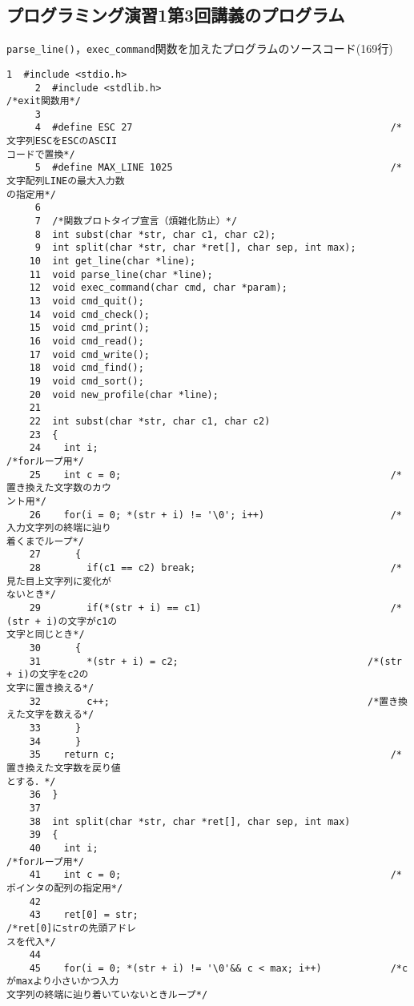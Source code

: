 \subsection{プログラミング演習1第3回講義のプログラム}\label{func3}
\verb|parse_line()|，\verb|exec_command|関数を加えたプログラムのソースコード(169行)
\begin{Verbatim}[fontsize=\small, baselinestretch=0.8]
     1	#include <stdio.h>
     2	#include <stdlib.h>                                        /*exit関数用*/
     3	
     4	#define ESC 27                                             /*文字列ESCをESCのASCII
コードで置換*/
     5	#define MAX_LINE 1025                                      /*文字配列LINEの最大入力数
の指定用*/
     6	
     7	/*関数プロトタイプ宣言（煩雑化防止）*/
     8	int subst(char *str, char c1, char c2);
     9	int split(char *str, char *ret[], char sep, int max);
    10	int get_line(char *line);
    11	void parse_line(char *line);
    12	void exec_command(char cmd, char *param);
    13	void cmd_quit();
    14	void cmd_check();
    15	void cmd_print();
    16	void cmd_read();
    17	void cmd_write();
    18	void cmd_find();
    19	void cmd_sort();
    20	void new_profile(char *line);
    21	
    22	int subst(char *str, char c1, char c2)
    23	{
    24	  int i;                                                   /*forループ用*/
    25	  int c = 0;                                               /*置き換えた文字数のカウ
ント用*/
    26	  for(i = 0; *(str + i) != '\0'; i++)                      /*入力文字列の終端に辿り
着くまでループ*/
    27	    {
    28	      if(c1 == c2) break;                                  /*見た目上文字列に変化が
ないとき*/
    29	      if(*(str + i) == c1)                                 /*(str + i)の文字がc1の
文字と同じとき*/
    30		{
    31		  *(str + i) = c2;                                 /*(str + i)の文字をc2の
文字に置き換える*/
    32		  c++;                                             /*置き換えた文字を数える*/
    33		}
    34	    }
    35	  return c;                                                /*置き換えた文字数を戻り値
とする．*/
    36	}
    37	
    38	int split(char *str, char *ret[], char sep, int max)
    39	{
    40	  int i;                                                   /*forループ用*/
    41	  int c = 0;                                               /*ポインタの配列の指定用*/
    42	
    43	  ret[0] = str;                                            /*ret[0]にstrの先頭アドレ
スを代入*/
    44	
    45	  for(i = 0; *(str + i) != '\0'&& c < max; i++)            /*cがmaxより小さいかつ入力
文字列の終端に辿り着いていないときループ*/

\end{Verbatim}

